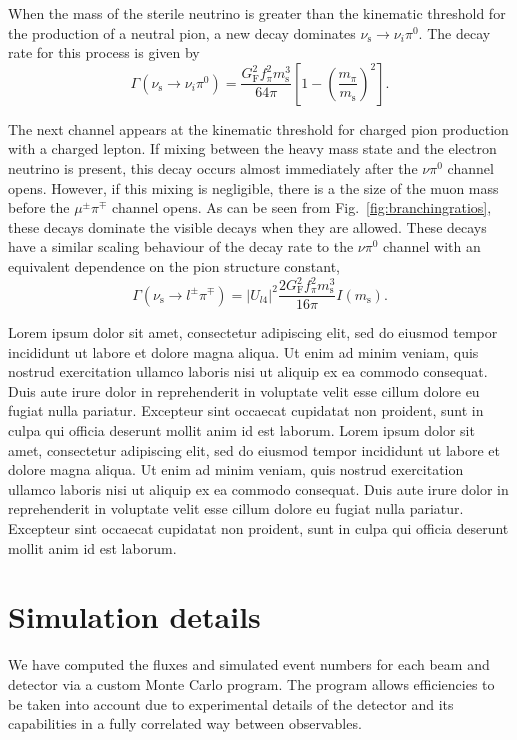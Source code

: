 \documentclass[11pt, a4paper]{article}
\newcommand{\reffig}[1]{Fig.~\ref{#1}}
\newcommand{\lorem}{ \textcolor[rgb]{0.8,0.8,0.8}{Lorem ipsum dolor sit amet, consectetur
adipiscing elit, sed do eiusmod tempor incididunt ut labore et dolore magna
aliqua. Ut enim ad minim veniam, quis nostrud exercitation ullamco laboris nisi
ut aliquip ex ea commodo consequat. Duis aute irure dolor in reprehenderit in
voluptate velit esse cillum dolore eu fugiat nulla pariatur. Excepteur sint
occaecat cupidatat non proident, sunt in culpa qui officia deserunt mollit anim
id est laborum.}}
\begin{document}
When the mass of the sterile neutrino is greater than the kinematic threshold
for the production of a neutral pion, a new decay dominates
$\nu_\text{s}\to\nu_i \pi^0$. The decay rate for this process is given by
%
\[ \Gamma\left(\nu_\text{s} \to \nu_i \pi^0\right) =
\frac{G_\text{F}^2f_\pi^2m_\text{s}^3}{64\pi}\left[1-\left(\frac{m_\pi}{m_\text{s}}\right)^2\right].
\]

The next channel appears at the kinematic threshold for charged pion production
with a charged lepton. If mixing between the heavy mass state and the electron
neutrino is present, this decay occurs almost immediately after the $\nu\pi^0$
channel opens. However, if this mixing is negligible, there is a the size of
the muon mass before the $\mu^\pm\pi^\mp$ channel opens. As can be seen from
\reffig{fig:branchingratios}, these decays dominate the visible decays when
they are allowed. These decays have a similar scaling behaviour of the decay
rate to the $\nu\pi^0$ channel with an equivalent dependence on the pion
structure constant,
%
\[ \Gamma\left(\nu_\text{s} \to l^\pm\pi^\mp\right) =
\left|U_{l4}\right|^2\frac{2G_\text{F}^2f_\pi^2m_\text{s}^3}{16\pi}I(m_\text{s}).
\]


\lorem\lorem

\section{Simulation details}

We have computed the fluxes and simulated event numbers for each beam and
detector via a custom Monte Carlo program. The program allows efficiencies to
be taken into account due to experimental details of the detector and its
capabilities in a fully correlated way between observables. 
\end{document}
